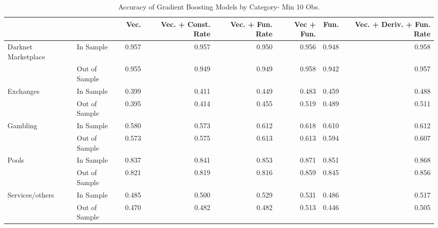 \begin{table}[ht]
\centering
\begin{tabular}{llrrrrrr}
  \hline
 &  & Vec. & Vec. + Const. Rate & Vec. + Fun. Rate & Vec + Fun. & Fun. & Vec. + Deriv. + Fun. Rate \\ 
  \hline
Darknet Marketplace & In Sample & 0.957 & 0.957 & 0.950 & 0.956 & 0.948 & 0.958 \\ 
   & Out of Sample & 0.955 & 0.949 & 0.949 & 0.958 & 0.942 & 0.957 \\ 
  Exchanges & In Sample & 0.399 & 0.411 & 0.449 & 0.483 & 0.459 & 0.488 \\ 
   & Out of Sample & 0.395 & 0.414 & 0.455 & 0.519 & 0.489 & 0.511 \\ 
  Gambling & In Sample & 0.580 & 0.573 & 0.612 & 0.618 & 0.610 & 0.612 \\ 
   & Out of Sample & 0.573 & 0.575 & 0.613 & 0.613 & 0.594 & 0.607 \\ 
  Pools & In Sample & 0.837 & 0.841 & 0.853 & 0.871 & 0.851 & 0.868 \\ 
   & Out of Sample & 0.821 & 0.819 & 0.816 & 0.859 & 0.845 & 0.856 \\ 
  Services/others & In Sample & 0.485 & 0.500 & 0.529 & 0.531 & 0.486 & 0.517 \\ 
   & Out of Sample & 0.470 & 0.482 & 0.482 & 0.513 & 0.446 & 0.505 \\ 
   \hline
\end{tabular}
\caption{Accuracy of Gradient Boosting Models by Category- Min 10 Obs.} 
\label{gbm_10obs_acc_cat}
\end{table}
